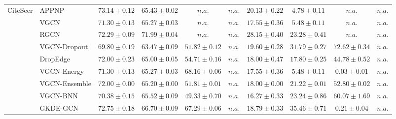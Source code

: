 \begin{table*}[!h]
{\begin{tabular}{ll|cccc|cccc}
        \multirow{10}{*}{CiteSeer}
        & APPNP & ${\mathbf{73.14}\scriptscriptstyle \pm 0.12}$ & ${65.43\scriptscriptstyle \pm 0.02}$ & $n.a.$ & $n.a.$ & ${20.13\scriptscriptstyle \pm 0.22}$ & ${4.78\scriptscriptstyle \pm 0.11}$ & $n.a.$ & $n.a.$\\
        & VGCN & ${71.30\scriptscriptstyle \pm 0.13}$ & ${65.27\scriptscriptstyle \pm 0.03}$ & $n.a.$ & $n.a.$ & ${17.55\scriptscriptstyle \pm 0.36}$ & ${5.48\scriptscriptstyle \pm 0.11}$ & $n.a.$ & $n.a.$\\
        & RGCN & ${72.29\scriptscriptstyle \pm 0.09}$ & ${{71.99}\scriptscriptstyle \pm 0.04}$ & $n.a.$ & $n.a.$ & ${28.15\scriptscriptstyle \pm 0.40}$ & ${23.28\scriptscriptstyle \pm 0.41}$ & $n.a.$ & $n.a.$\\
        & VGCN-Dropout & ${69.80\scriptscriptstyle \pm 0.19}$ & ${63.47\scriptscriptstyle \pm 0.09}$ & ${51.82\scriptscriptstyle \pm 0.12}$ & $n.a.$ & ${19.60\scriptscriptstyle \pm 0.28}$ & ${31.79\scriptscriptstyle \pm 0.27}$ & ${{72.62}\scriptscriptstyle \pm 0.34}$ & $n.a.$\\
        & DropEdge & ${72.00\scriptscriptstyle \pm 0.23}$ & ${65.00\scriptscriptstyle \pm 0.05}$ & ${54.71\scriptscriptstyle \pm 0.16}$ & $n.a.$ & ${18.00\scriptscriptstyle \pm 0.47}$ & ${17.80\scriptscriptstyle \pm 0.25}$ & ${44.78\scriptscriptstyle \pm 0.52}$ & $n.a.$\\
        & VGCN-Energy & ${71.30\scriptscriptstyle \pm 0.13}$ & ${65.27\scriptscriptstyle \pm 0.03}$ & ${{68.16}\scriptscriptstyle \pm 0.06}$ & $n.a.$ & ${17.55\scriptscriptstyle \pm 0.36}$ & ${5.48\scriptscriptstyle \pm 0.11}$ & ${0.03\scriptscriptstyle \pm 0.01}$ & $n.a.$\\
        & VGCN-Ensemble & ${72.00\scriptscriptstyle \pm 0.00}$ & ${65.20\scriptscriptstyle \pm 0.00}$ & ${51.81\scriptscriptstyle \pm 0.01}$ & $n.a.$ & ${18.00\scriptscriptstyle \pm 0.00}$ & ${21.22\scriptscriptstyle \pm 0.01}$ & ${52.80\scriptscriptstyle \pm 0.02}$ & $n.a.$\\
        & VGCN-BNN & ${70.38\scriptscriptstyle \pm 0.15}$ & ${65.52\scriptscriptstyle \pm 0.09}$ & ${49.33\scriptscriptstyle \pm 0.70}$ & $n.a.$ & ${16.27\scriptscriptstyle \pm 0.33}$ & ${23.24\scriptscriptstyle \pm 0.86}$ & ${60.07\scriptscriptstyle \pm 1.69}$ & $n.a.$\\
        & GKDE-GCN & ${72.75\scriptscriptstyle \pm 0.18}$ & ${66.70\scriptscriptstyle \pm 0.09}$ & ${67.29\scriptscriptstyle \pm 0.06}$ & $n.a.$ & ${18.79\scriptscriptstyle \pm 0.33}$ & ${35.46\scriptscriptstyle \pm 0.71}$ & ${0.21\scriptscriptstyle \pm 0.04}$ & $n.a.$\\

\end{tabular}}
\end{table*}
